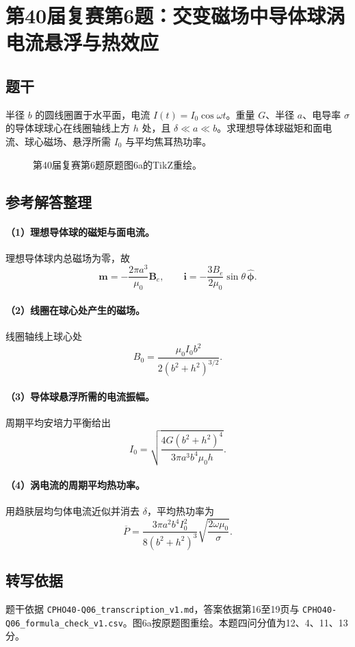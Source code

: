 \section{第40届复赛第6题：交变磁场中导体球涡电流悬浮与热效应}
\subsection{题干}
半径 $b$ 的圆线圈置于水平面，电流 $I(t)=I_0\cos\omega t$。重量 $G$、半径 $a$、电导率 $\sigma$ 的导体球球心在线圈轴线上方 $h$ 处，且 $\delta\ll a\ll b$。求理想导体球磁矩和面电流、球心磁场、悬浮所需 $I_0$ 与平均焦耳热功率。
\begin{figure}[htbp]\centering\caption{第40届复赛第6题原题图6a的TikZ重绘。}\end{figure}
\subsection{参考解答整理}
\paragraph{（1）理想导体球的磁矩与面电流。}
理想导体球内总磁场为零，故
\[\boxed{\boldsymbol m=-\frac{2\pi a^3}{\mu_0}\boldsymbol B_e,\qquad \boldsymbol i=-\frac{3B_e}{2\mu_0}\sin\theta\,\hat{\boldsymbol\phi}.}\]
\paragraph{（2）线圈在球心处产生的磁场。}
线圈轴线上球心处
\[B_0=\frac{\mu_0I_0b^2}{2(b^2+h^2)^{3/2}}.\]
\paragraph{（3）导体球悬浮所需的电流振幅。}
周期平均安培力平衡给出
\[\boxed{I_0=\sqrt{\frac{4G(b^2+h^2)^4}{3\pi a^3b^4\mu_0h}}}.\]
\paragraph{（4）涡电流的周期平均热功率。}
用趋肤层均匀体电流近似并消去 $\delta$，平均热功率为
\[\boxed{\overline P=\frac{3\pi a^2b^4I_0^2}{8(b^2+h^2)^3}\sqrt{\frac{2\omega\mu_0}{\sigma}}}.\]
\subsection{转写依据}
题干依据 \texttt{CPHO40-Q06\_transcription\_v1.md}，答案依据第16至19页与 \texttt{CPHO40-Q06\_formula\_check\_v1.csv}。图6a按原题图重绘。本题四问分值为12、4、11、13分。
